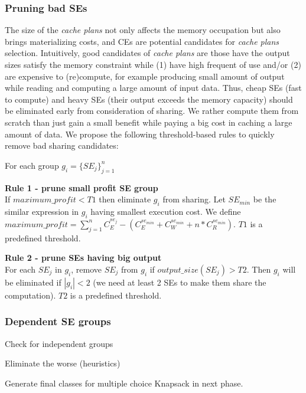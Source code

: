 

\subsubsection{Pruning bad SEs}
\label{sec:se-prune}
The size of the \emph{cache plans} not only affects the memory occupation but also brings materializing costs, and CEs are potential candidates for \emph{cache plans} selection. Intuitively, good candidates of \emph{cache plans} are those have the output sizes satisfy the memory constraint while (1) have high frequent of use and/or (2) are expensive to (re)compute, for example producing small amount of output while reading and computing a large amount of input data. Thus, cheap SEs (fast to compute) and heavy SEs (their output exceeds the memory capacity) should be eliminated early from consideration of sharing. We rather compute them from scratch than just gain a small benefit while paying a big cost in caching a large amount of data. We propose the following threshold-based rules to quickly remove bad sharing candidates:

For each group $g_i=\{SE_j\}_{j=1}^n$

\textbf{Rule 1 - prune small profit SE group}\\
If $maximum\_profit < T1$ then eliminate $g_i$ from sharing. Let $SE_{min}$ be the similar expression in $g_i$ having smallest execution cost. We define $maximum\_profit=\sum_{j=1}^{n}C_{E}^{se_j} - (C_{E}^{se_{min}} + C_{W}^{se_{min}} + n*C_{R}^{se_{min}})$. $T1$ is a predefined threshold.

\textbf{Rule 2 - prune SEs having big output}\\
For each $SE_j$ in $g_i$, remove $SE_j$ from $g_i$ if $output\_size(SE_j) > T2$. Then $g_i$ will be eliminated if $|g_i| < 2$ (we need at least 2 SEs to make them share the computation). $T2$ is a predefined threshold.

\subsubsection{Dependent SE groups}
Check for independent groups

Eliminate the worse (heuristics)

Generate final classes for multiple choice Knapsack in next phase.

